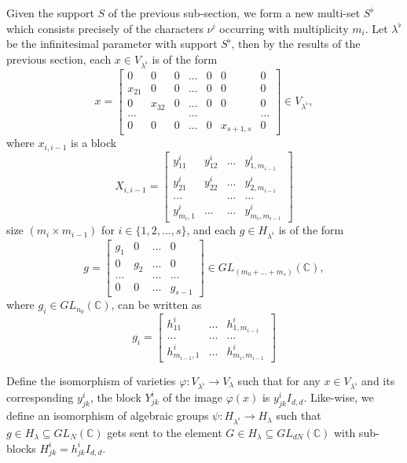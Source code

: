 \documentclass{memoir}
\newcommand{\bc}{\mathbb{C}}
\newcommand{\vi}{\varphi}
\theoremstyle{definition}
\begin{document}
	Given the support $S$ of the previous sub-section, we form a new multi-set $S^\flat$ which consists precisely of the characters $\nu^i$ occurring with multiplicity $m_i$.  
	Let $\lambda^\flat$ be the infinitesimal parameter with support $S^\flat$, then by the results of the previous section, each $x\in V_{\lambda^\flat}$ is of the form
	$$x=\begin{bmatrix}
		0 & 0 & 0 & ... & 0 & 0 & 0 \\
		x_{21} & 0 & 0 & ... & 0 & 0 & 0 \\
		0 & x_{32} & 0 & ... & 0 & 0 & 0 \\
		... & & & ... & & & ... \\
		0 & 0 & 0 & ... & 0 & x_{s+1,s} & 0 
	\end{bmatrix}\in V_{\lambda^\flat},$$
	where $x_{i,i-1}$ is a block
	$$X_{i, i-1}=\begin{bmatrix}
		y_{11}^i & y_{12}^i & ... & y_{1, m_{i-1}}^i\\
		y_{21}^i & y_{22}^i & ... & y_{2, m_{i-1}}^i \\
		... & & ... & ...\\
		y_{m_i, 1}^i & ... & ... & y_{m_i, m_{i-1}}^i
	\end{bmatrix}$$
	size $(m_i\times m_{i-1})$ for $i\in \{1, 2, ..., s\}$, 
	and each $g\in H_{\lambda^\flat}$ is of the form
	$$g=\begin{bmatrix}
		g_1 & 0 & ... & 0 \\
		0 & g_2 & ... & 0 \\
		... & & ... & ...\\
		0 & 0 & ... & g_{s-1}
	\end{bmatrix}\in GL_{(m_0+... +m_s)}(\bc),$$
	where $g_i\in GL_{n_0}(\bc)$, can be written as 
	$$g_i=\begin{bmatrix}
		h_{11}^i & ... & h_{1,m_{i-1}}^i \\
		... & ... & ... \\
		h_{m_{i-1}, 1}^i & ... & h_{m_i, m_{i-1}}^i
	\end{bmatrix}$$ 
	
	Define the isomorphism of varieties $\vi:V_{\lambda^\flat}\to V_\lambda$ such that for any $x\in V_{\lambda^\flat}$ and its corresponding $y_{jk}^i$, the block $Y_{jk}^i$ of the image $\vi(x)$ is $y_{jk}^i I_{d,d}$.  
	Like-wise, we define an isomorphism of algebraic groups $\psi:H_{\lambda^\flat}\to H_\lambda$ such that $g\in H_\lambda\subseteq GL_N(\bc)$ gets sent to the element $G\in H_\lambda\subseteq GL_{dN}(\bc)$ with sub-blocks $H_{jk}^i=h_{jk}^i I_{d,d}$. 
	
\end{document}
